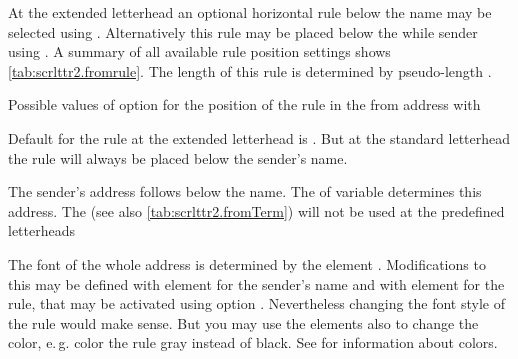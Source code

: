 At the extended letterhead an
optional horizontal rule below the name may be selected using
.
Alternatively this rule may
be placed below the while sender using . A
summary of all available rule position settings shows
\autoref{tab:scrlttr2.fromrule}. The length of this rule is determined by
pseudo-length .

\begin{table}
  \caption[{Possible values of option  with
    }]{Possible values of option  for the
    position of the rule in the from address with
    }
  \label{tab:scrlttr2.fromrule}
  \begin{desctabular}
  \end{desctabular}
\end{table}

Default for the rule at the extended letterhead is . But at the
standard letterhead the rule will always be placed below the sender's name.

The sender's address follows below the
name. The  of variable  determines this
address. The  (see also \autoref{tab:scrlttr2.fromTerm})
will not be used at the predefined letterheads

%
%
%
The font of the whole address is determined by the element
%
. Modifications to this may be defined
with element %
 for the sender's name and with element
%
 for the rule, that may be activated using
option . Nevertheless changing the font style of the rule
would make sense. But you may use the elements also to change the color,
e.\,g. color the rule gray instead of black. See \cite{package:xcolor} for
information about colors.%
%
%
%
%

